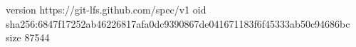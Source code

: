 version https://git-lfs.github.com/spec/v1
oid sha256:6847f17252ab46226817afa0dc9390867de041671183f6f45333ab50c94686bc
size 87544
